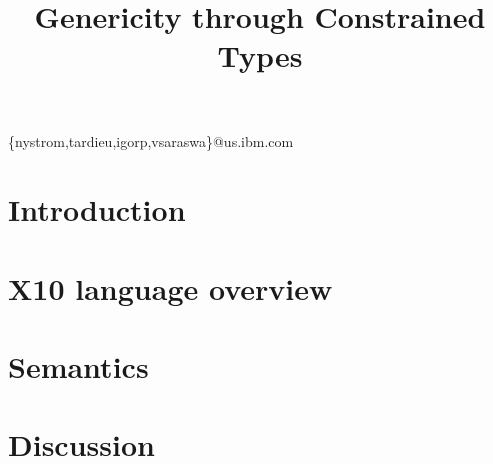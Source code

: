 \documentclass[preprint,nocopyrightspace,9pt]{sigplanconf}
\newif\iflncs
\begin{document}
\title{Genericity through Constrained Types}

\iflncs

\author{
Nathaniel Nystrom\inst{1}
\and
Olivier Tardieu\inst{1}
\and
Igor Peshansky\inst{1}
\and
Vijay Saraswat\inst{1}
}

\institute{IBM T.~J. Watson Research~Center,
P.O.~Box~704, Yorktown~Heights NY 10598 USA,
\email{\{nystrom,igorp,vsaraswa,tardieu\}@us.ibm.com}}

\else

  {\{nystrom,tardieu,igorp,vsaraswa\}@us.ibm.com}


\fi

\maketitle

\begin{abstract}

\end{abstract}


\section{Introduction}
\label{sec:intro}
%


\section{X10 language overview}
\label{sec:lang}


\eat{}

\section{Semantics}
\label{sec:semantics}



\section{Discussion}
\label{sec:discussion}

\end{document}
